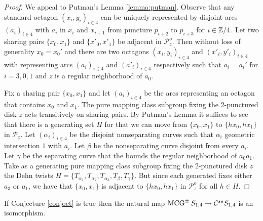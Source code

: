 \begin{proof}
  We appeal to Putman's Lemma \ref{lemma:putman}.
  Observe that any standard octagon $(x_i,y_i)_{i \in 4}$ can be uniquely
  represented by disjoint arcs $(a_i)_{i \in 4}$ with $a_i$
  in $x_i$ and $x_{i+1}$
  from puncture $p_{i+2}$ to $p_{i+3}$ for $i \in \mathbb{Z}/4$.
  Let two sharing pairs $\{x_0,x_1\}$ and $\{x'_0,x'_1\}$ be adjacent in $\mathcal P^o_z$.
  Then without loss of generality
    $x_0=x_0'$ and there are two octagons $(x_i,y_i)_{i \in 4}$ and $(x'_i,y'_i)_{i \in 4}$
  with representing arcs $(a_i)_{i \in 4}$ and $(a'_i)_{i \in 4}$ respectively
  such that $a_i=a_i'$ for $i=3,0,1$ and  $z$ is a regular neighborhood of $a_0$.

  Fix  a sharing pair $\{x_0,x_1\}$ and let $(a_i)_{i \in 4}$ be the arcs representing an octagon that contains $x_0$ and $x_1$.
  The pure mapping class subgroup fixing the 2-punctured disk $z$
  acts transitively on sharing pairs.
  By Putman's Lemma it suffices to see that
  there is a generating set $H$ for that we can move from $\{x_0,x_1\}$ to $\{hx_0,hx_1\}$
  in $\mathcal P_z$.
  Let $(\alpha_i)_{i \in 4}$ be the disjoint  nonseparating curves such that $\alpha_i$ geometric intersection $1$ with $a_i$. Let $\beta$ be the nonseparating curve disjoint from every $a_i$.
  Let $\gamma$ be the separating curve that the bounds the regular neighborhood of $a_0a_1$.
  Take as a generating pure mapping class subgroup fixing the 2-punctured disk $z$
  the Dehn twists $H=\{T_{\alpha_1},T_{\alpha_2}, T_{\alpha_3}, T_{\beta}, T_\gamma \}$.
  But since each generated fixes either $a_3$ or $a_1$,
  we have that $\{x_0,x_1\}$ is adjacent to $\{hx_0,hx_1\}$ in $\mathcal P^o_z$ for all $h \in H$.
\end{proof}

\begin{proposition}
  If Conjecture \ref{conjoct} is true then
  the natural map $\operatorname{MCG}^\pm S_{1,4} \to  \mathcal C^{{ss}}  S_{1,4}$
  is an isomorphism.
\end{proposition}

